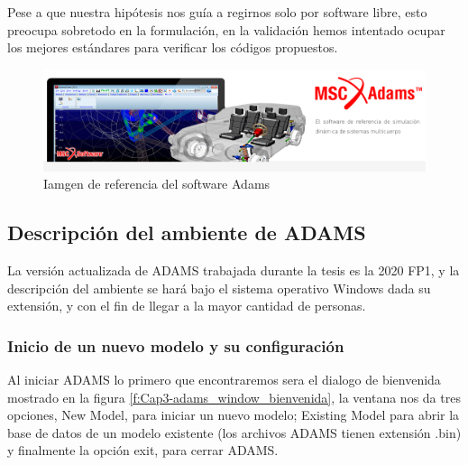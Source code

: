     Pese a que nuestra hipótesis nos guía a regirnos solo por software libre, esto preocupa sobretodo en la formulación, en la validación hemos intentado ocupar los mejores estándares para verificar los códigos propuestos.
    
    
    \begin{figure}[htb]
        \centering
        \includegraphics[width=1\linewidth]{Main/Chapter3/Images3/adams/logo_adams.png}
        \caption{Iamgen de referencia del software Adams}
        \label{f:Cap3-adams_logo}
    \end{figure} 
    
    
    \subsection{Descripción del ambiente de ADAMS}
    
    La versión actualizada de ADAMS trabajada durante la tesis es la 2020 FP1, y la descripción del ambiente se hará bajo el sistema operativo Windows dada su extensión, y con el fin de llegar a la mayor cantidad de personas.
    
        \subsubsection{Inicio de un nuevo modelo y su configuración}
        
            Al iniciar ADAMS lo primero que encontraremos sera el dialogo de bienvenida mostrado en la figura \ref{f:Cap3-adams_window_bienvenida}, la ventana nos da tres opciones, New Model, para iniciar un nuevo modelo; Existing Model para abrir la base de datos de un modelo existente (los archivos ADAMS tienen extensión .bin) y finalmente la opción exit, para cerrar ADAMS. 
            

